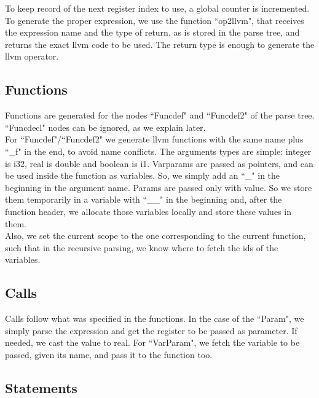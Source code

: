 \documentclass[12pt]{article}
\begin{document}
To keep record of the next register index to use, a global counter is incremented. \\
To generate the proper expression, we use the function ``op2llvm", that receives the expression name and the type of return, as is stored in the parse tree, and returns the exact llvm code to be used. The return type is enough to generate the llvm operator.\\

\subsection{Functions}

Functions are generated for the nodes ``Funcdef" and ``Funcdef2" of the parse tree. ``Funcdecl" nodes can be ignored, as we explain later. \\
For ``Funcdef"/``Funcdef2" we generate llvm functions with the same name plus ``\_f" in the end, to avoid name conflicts. The arguments types are simple: integer is i32, real is double and boolean is i1. Varparams are passed as pointers, and can be used inside the function as variables. So, we simply add an ``\_" in the beginning in the argument name. Params are passed only with value. So we store them temporarily in a variable with ``\_\_" in the beginning and, after the function header, we allocate those variables locally and store these values in them. \\
Also, we set the current scope to the one corresponding to the current function, such that in the recursive parsing, we know where to fetch the ids of the variables.

\subsection{Calls}

Calls follow what was specified in the functions. In the case of the ``Param", we simply parse the expression and get the register to be passed as parameter. If needed, we cast the value to real. For ``VarParam", we fetch the variable to be passed, given its name, and pass it to the function too.

\subsection{Statements}
\end{document}
